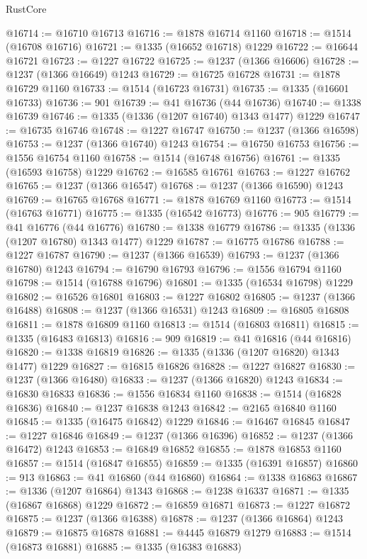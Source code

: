 \begin{lexlean}{RustCore}
\begin{coremodule}
@16714 := @16710 @16713
@16716 := @1878 @16714 @1160
@16718 := @1514 (@16708 @16716)
@16721 := @1335 (@16652 @16718) @1229
@16722 := @16644 @16721
@16723 := @1227 @16722
@16725 := @1237 (@1366 @16606)
@16728 := @1237 (@1366 @16649) @1243
@16729 := @16725 @16728
@16731 := @1878 @16729 @1160
@16733 := @1514 (@16723 @16731)
@16735 := @1335 (@16601 @16733)
@16736 := 901
@16739 := @41 @16736 (@44 @16736)
@16740 := @1338 @16739
@16746 := @1335 (@1336 (@1207 @16740) @1343 @1477) @1229
@16747 := @16735 @16746
@16748 := @1227 @16747
@16750 := @1237 (@1366 @16598)
@16753 := @1237 (@1366 @16740) @1243
@16754 := @16750 @16753
@16756 := @1556 @16754 @1160
@16758 := @1514 (@16748 @16756)
@16761 := @1335 (@16593 @16758) @1229
@16762 := @16585 @16761
@16763 := @1227 @16762
@16765 := @1237 (@1366 @16547)
@16768 := @1237 (@1366 @16590) @1243
@16769 := @16765 @16768
@16771 := @1878 @16769 @1160
@16773 := @1514 (@16763 @16771)
@16775 := @1335 (@16542 @16773)
@16776 := 905
@16779 := @41 @16776 (@44 @16776)
@16780 := @1338 @16779
@16786 := @1335 (@1336 (@1207 @16780) @1343 @1477) @1229
@16787 := @16775 @16786
@16788 := @1227 @16787
@16790 := @1237 (@1366 @16539)
@16793 := @1237 (@1366 @16780) @1243
@16794 := @16790 @16793
@16796 := @1556 @16794 @1160
@16798 := @1514 (@16788 @16796)
@16801 := @1335 (@16534 @16798) @1229
@16802 := @16526 @16801
@16803 := @1227 @16802
@16805 := @1237 (@1366 @16488)
@16808 := @1237 (@1366 @16531) @1243
@16809 := @16805 @16808
@16811 := @1878 @16809 @1160
@16813 := @1514 (@16803 @16811)
@16815 := @1335 (@16483 @16813)
@16816 := 909
@16819 := @41 @16816 (@44 @16816)
@16820 := @1338 @16819
@16826 := @1335 (@1336 (@1207 @16820) @1343 @1477) @1229
@16827 := @16815 @16826
@16828 := @1227 @16827
@16830 := @1237 (@1366 @16480)
@16833 := @1237 (@1366 @16820) @1243
@16834 := @16830 @16833
@16836 := @1556 @16834 @1160
@16838 := @1514 (@16828 @16836)
@16840 := @1237 @16838 @1243
@16842 := @2165 @16840 @1160
@16845 := @1335 (@16475 @16842) @1229
@16846 := @16467 @16845
@16847 := @1227 @16846
@16849 := @1237 (@1366 @16396)
@16852 := @1237 (@1366 @16472) @1243
@16853 := @16849 @16852
@16855 := @1878 @16853 @1160
@16857 := @1514 (@16847 @16855)
@16859 := @1335 (@16391 @16857)
@16860 := 913
@16863 := @41 @16860 (@44 @16860)
@16864 := @1338 @16863
@16867 := @1336 (@1207 @16864) @1343
@16868 := @1238 @16337
@16871 := @1335 (@16867 @16868) @1229
@16872 := @16859 @16871
@16873 := @1227 @16872
@16875 := @1237 (@1366 @16388)
@16878 := @1237 (@1366 @16864) @1243
@16879 := @16875 @16878
@16881 := @4445 @16879 @1279
@16883 := @1514 (@16873 @16881)
@16885 := @1335 (@16383 @16883)

\end{coremodule}
\end{lexlean}
